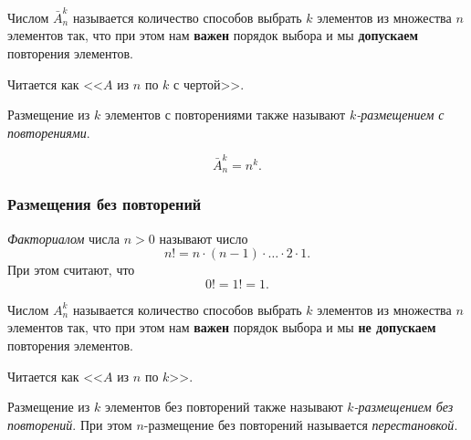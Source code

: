 \begin{multicols}{2}
      \begin{definition}{}{}
        Числом $\bar{A}_n^k$ называется количество способов выбрать $k$ элементов из множества $n$ элементов так, что при этом нам \textbf{важен} порядок выбора и мы \textbf{допускаем} повторения элементов.
      \end{definition}

      \begin{note}{}{}
        Читается как <<$A$ из $n$ по $k$ с чертой>>.
      \end{note}

      \begin{note}{}{}
        Размещение из $k$ элементов с повторениями также называют \textit{$k$-размещением с повторениями}.
      \end{note}

      \begin{theorema}{}{}
        \[
          \bar{A}_n^k = n^k.
        \]
      \end{theorema}

      \subsubsection*{Размещения без повторений}

      \begin{definition}{}{}
        \textit{Факториалом} числа $n > 0$ называют число
        \[
          n! = n \cdot (n - 1) \cdot \ldots \cdot 2 \cdot 1.
        \]
        При этом считают, что
        \[
          0! = 1! = 1.
        \]
      \end{definition}

      \begin{definition}{}{}
        Числом $A_n^k$ называется количество способов выбрать $k$ элементов из множества $n$ элементов так, что при этом нам \textbf{важен} порядок выбора и мы \textbf{не допускаем} повторения элементов.
      \end{definition}

      \begin{note}{}{}
        Читается как <<$A$ из $n$ по $k$>>.
      \end{note}

      \begin{note}{}{}
        Размещение из $k$ элементов без повторений также называют \textit{$k$-размещением без повторений}.
        При этом $n$-размещение без повторений называется \textit{перестановкой}.
      \end{note}


\end{multicols}

